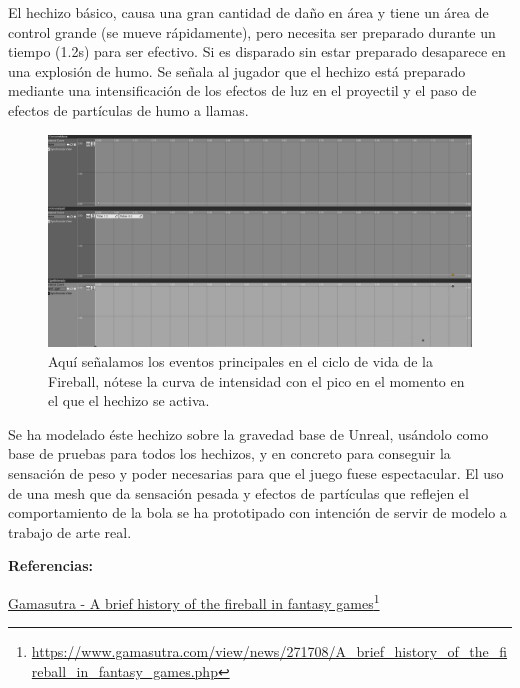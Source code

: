 \documentclass[12pt]{report}
\begin{document}
El hechizo básico, causa una gran cantidad de daño en área y tiene un área de control grande (se mueve rápidamente), pero necesita ser preparado durante un tiempo (1.2s) para ser efectivo. Si es disparado sin estar preparado desaparece en una explosión de humo. Se señala al jugador que el hechizo está preparado mediante una intensificación de los efectos de luz en el proyectil y el paso de efectos de partículas de humo a llamas.

\begin{figure}[H]
    \centering
    \includegraphics[width=1\textwidth]{fireball_timelines}
	\captionsetup{labelformat=empty}
    \caption{Aquí señalamos los eventos principales en el ciclo de vida de la Fireball, nótese la curva de intensidad con el pico en el momento en el que el hechizo se activa.}
\end{figure}

Se ha modelado éste hechizo sobre la gravedad base de Unreal, usándolo como base de pruebas para todos los hechizos, y en concreto para conseguir la sensación de peso y poder necesarias para que el juego fuese espectacular. El uso de una mesh que da sensación pesada y efectos de partículas que reflejen el comportamiento de la bola se ha prototipado con intención de servir de modelo a trabajo de arte real.

\textbf{Referencias:}

\href{https://www.gamasutra.com/view/news/271708/A_brief_history_of_the_fireball_in_fantasy_games.php}{Gamasutra - A brief history of the fireball in fantasy games}\footnote{\url{https://www.gamasutra.com/view/news/271708/A_brief_history_of_the_fireball_in_fantasy_games.php}}
\end{document}
